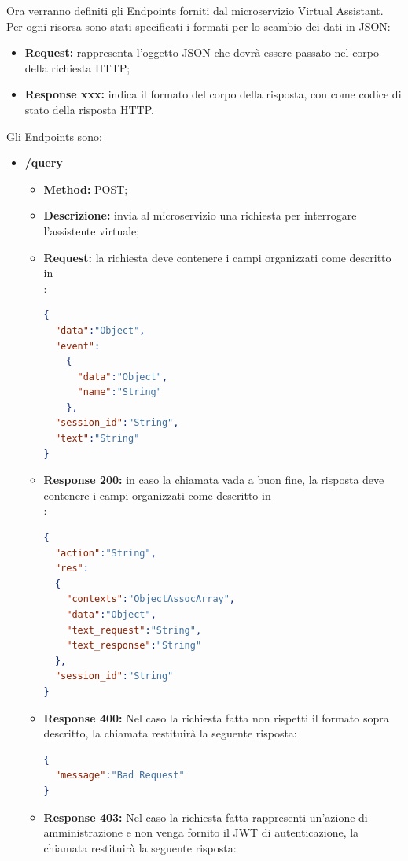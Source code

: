 Ora verranno definiti gli Endpoints forniti dal microservizio Virtual Assistant.\\
Per ogni risorsa sono stati specificati i formati per lo scambio dei dati in JSON:
\begin{itemize}
\item \textbf{Request:} rappresenta l’oggetto JSON che dovrà essere passato nel corpo della richiesta HTTP;
\item \textbf{Response xxx:} indica il formato del corpo della risposta, con  come codice di stato della risposta HTTP.
\end{itemize}
Gli Endpoints sono:
\begin{itemize}
\item \textbf{/query}\\
\begin{itemize}
\item \textbf{Method:} POST;
\item \textbf{Descrizione:} invia al microservizio una richiesta per interrogare l'assistente virtuale;
\item \textbf{Request:} la richiesta deve contenere i campi organizzati come descritto in \\:
\begin{lstlisting}[language=json,firstnumber=1]
{
  "data":"Object",
  "event":
    {
      "data":"Object",
      "name":"String"
    },
  "session_id":"String",
  "text":"String"
}
\end{lstlisting}
\item \textbf{Response 200:} in caso la chiamata vada a buon fine, la risposta deve contenere i campi organizzati come descritto in \\:
\begin{lstlisting}[language=json,firstnumber=1]
{
  "action":"String",
  "res":
  {
    "contexts":"ObjectAssocArray",
    "data":"Object",
    "text_request":"String",
    "text_response":"String"
  },
  "session_id":"String"
}
\end{lstlisting}
\item \textbf{Response 400:} Nel caso la richiesta fatta non rispetti il formato sopra descritto, la chiamata restituirà la seguente risposta:
\begin{lstlisting}[language=json,firstnumber=1]
{
  "message":"Bad Request"
}
\end{lstlisting}
\item \textbf{Response 403:} Nel caso la richiesta fatta rappresenti un'azione di amministrazione e non venga fornito il JWT di autenticazione, la chiamata restituirà la seguente risposta:

\end{itemize}
\end{itemize}
